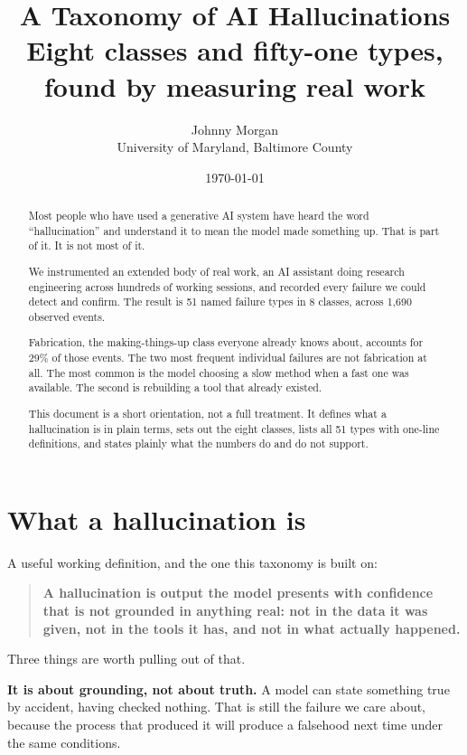 \documentclass[11pt]{article}
\title{\textbf{A Taxonomy of AI Hallucinations}\\[4pt]
\large Eight classes and fifty-one types, found by measuring real work}
\author{Johnny Morgan\\ \small University of Maryland, Baltimore County}
\date{\today}
\begin{document}
\maketitle

\begin{abstract}
\noindent
Most people who have used a generative AI system have heard the word
``hallucination'' and understand it to mean the model made something up. That is
part of it. It is not most of it.

We instrumented an extended body of real work, an AI assistant doing research
engineering across hundreds of working sessions, and recorded every failure we
could detect and confirm. The result is 51 named failure types in 8 classes,
across 1,690 observed events.

Fabrication, the making-things-up class everyone already knows about, accounts
for 29\% of those events. The two most frequent individual failures are not
fabrication at all. The most common is the model choosing a slow method when a
fast one was available. The second is rebuilding a tool that already existed.

This document is a short orientation, not a full treatment. It defines what a
hallucination is in plain terms, sets out the eight classes, lists all 51 types
with one-line definitions, and states plainly what the numbers do and do not
support.
\end{abstract}

\section{What a hallucination is}

A useful working definition, and the one this taxonomy is built on:

\begin{quote}
\textbf{A hallucination is output the model presents with confidence that is not
grounded in anything real: not in the data it was given, not in the tools it
has, and not in what actually happened.}
\end{quote}

Three things are worth pulling out of that.

\textbf{It is about grounding, not about truth.} A model can state something
true by accident, having checked nothing. That is still the failure we care
about, because the process that produced it will produce a falsehood next time
under the same conditions.
\end{document}
